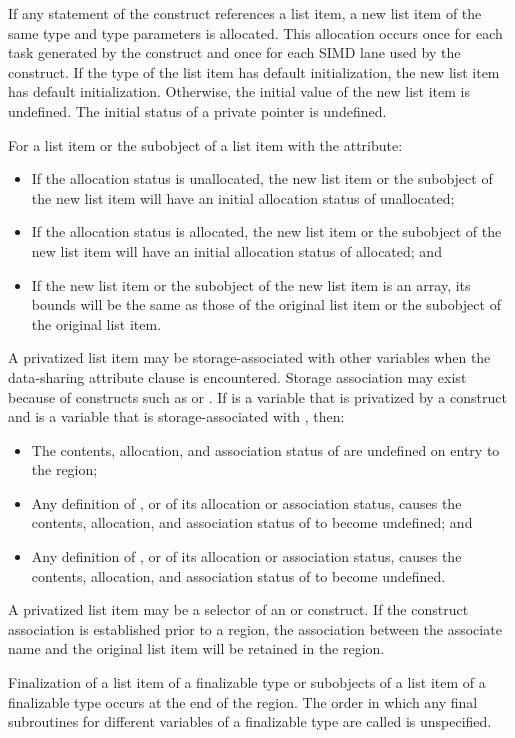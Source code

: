 \begin{fortranspecific}
If any statement of the construct references a list item, a new list
item of the same type and type parameters is allocated. This
allocation occurs once for each task generated by the construct and
once for each SIMD lane used by the construct.  If the type of the
list item has default initialization, the new list item has default
initialization.  Otherwise, the initial value of the new list item is
undefined.  The initial status of a private pointer is undefined.

For a list item or the subobject of a list item with the  attribute:

\begin{itemize}
\item If the allocation status is unallocated, the new list item or the subobject
      of the new list item will have an initial allocation status of unallocated;
\item If the allocation status is allocated, the new list item or the subobject of
      the new list item will have an initial allocation status of allocated; and
\item If the new list item or the subobject of the new list item is an array, its 
      bounds will be the same as those of the original list item or the subobject 
      of the original list item.
\end{itemize}

A privatized list item may be storage-associated with other variables when the 
data-sharing attribute clause is encountered. Storage association may exist
because of constructs such as  or . If 
is a variable that is privatized by a construct and  is a variable that 
is storage-associated with , then:

\begin{itemize}
\item The contents, allocation, and association status of  are undefined 
      on entry to the region;
\item Any definition of , or of its allocation or association status, 
      causes the contents, allocation, and association status of  to 
      become undefined; and
\item Any definition of , or of its allocation or association status, 
      causes the contents, allocation, and association status of  to 
      become undefined.
\end{itemize}

A privatized list item may be a selector of an  or
 construct. If the construct association is established
prior to a  region, the association between the associate name
and the original list item will be retained in the region.

Finalization of a list item of a finalizable type or subobjects of a
list item of a finalizable type occurs at the end of the region. The
order in which any final subroutines for different variables of a
finalizable type are called is unspecified.
\end{fortranspecific}

